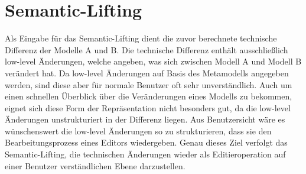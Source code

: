 \section{Semantic-Lifting}
\label{sec:lifting}

Als Eingabe für das Semantic-Lifting dient die zuvor berechnete technische Differenz der Modelle A
und B. Die technische Differenz enthält ausschließlich low-level Änderungen, welche angeben, was
sich zwischen Modell A und Modell B verändert hat. Da low-level Änderungen auf Basis des Metamodells
angegeben werden, sind diese aber für normale Benutzer oft sehr unverständlich. Auch um einen
schnellen Überblick über die Veränderungen eines Modells zu bekommen, eignet sich diese Form der
Repräsentation nicht besonders gut, da die low-level Änderungen unstrukturiert in der Differenz
liegen. Aus Benutzersicht wäre es wünschenswert die low-level Änderungen so zu strukturieren, dass
sie den Bearbeitungsprozess eines Editors wiedergeben. Genau dieses Ziel verfolgt das
Semantic-Lifting, die technischen Änderungen wieder als Editieroperation auf einer Benutzer
verständlichen Ebene darzustellen. 

